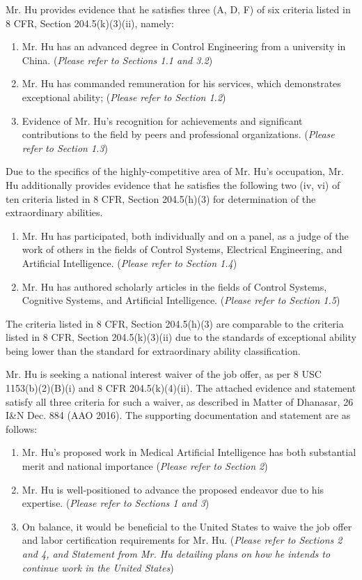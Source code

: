 \documentclass{article}
\begin{document}
Mr. Hu provides evidence that he satisfies three (A, D, F) of six criteria listed in 8 CFR, Section 204.5(k)(3)(ii), namely:
\begin{enumerate}
    \item Mr. Hu has an advanced degree in Control Engineering from a university in China. ({\it Please refer to Sections 1.1 and 3.2})
    \item Mr. Hu has commanded remuneration for his services, which demonstrates exceptional ability; ({\it Please refer to Section 1.2})
    \item Evidence of Mr. Hu's recognition for achievements and significant contributions to the field by peers and professional organizations. ({\it Please refer to Section 1.3})
\end{enumerate}
Due to the specifics of the highly-competitive area of Mr. Hu's occupation, Mr. Hu additionally provides evidence that he satisfies the following two (iv, vi) of ten criteria listed in 8 CFR, Section 204.5(h)(3) for determination of the extraordinary abilities. 
\begin{enumerate}
    \item Mr. Hu has participated, both individually and on a panel, as a judge of the work of others in the fields of Control Systems, Electrical Engineering, and Artificial Intelligence. ({\it Please refer to Section 1.4})
    \item Mr. Hu has authored scholarly articles in the fields of Control Systems, Cognitive Systems, and Artificial Intelligence. ({\it Please refer to Section 1.5})
\end{enumerate}

The criteria listed in 8 CFR, Section 204.5(h)(3) are comparable to the criteria listed in 8 CFR, Section 204.5(k)(3)(ii) due to the standards of exceptional ability being lower than the standard for extraordinary ability classification.

Mr. Hu is seeking a national interest waiver of the job offer, as per 8 USC 1153(b)(2)(B)(i) and 8 CFR  204.5(k)(4)(ii). The attached evidence and statement satisfy all three criteria for such a waiver, as described in Matter of Dhanasar, 26 I\&N Dec. 884 (AAO 2016). The supporting documentation and statement are as follows:

\begin{enumerate}
    \item Mr. Hu’s proposed work in Medical Artificial Intelligence has both substantial merit and national importance ({\it Please refer to Section 2})
    \item Mr. Hu is well-positioned to advance the proposed endeavor due to his expertise. ({\it Please refer to Sections 1 and 3})
    \item On balance, it would be beneficial to the United States to waive the job offer and labor certification requirements for Mr. Hu. ({\it Please refer to Sections 2 and 4, and Statement from Mr. Hu detailing plans on how he intends to continue work in the United States})
\end{enumerate}
\end{document}
